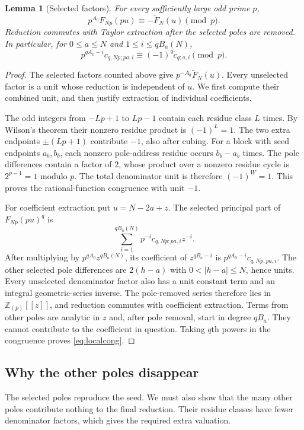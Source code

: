 \documentclass[11pt]{article}
\newtheorem{lemma}[theorem]{Lemma}
\newcommand{\Z}{\mathbb Z}\newcommand{\Q}{\mathbb Q}
\begin{document}
\begin{lemma}[Selected factors]\label{lem:selected}
For every sufficiently large odd prime $p$,
\[
 p^{A_0}F_{Np}(pu)\equiv-\widetilde F_N(u)\pmod p.
\]
Reduction commutes with Taylor extraction after the selected poles are
removed. In particular, for $0\le a\le N$ and $1\le i\le qB_a(N)$,
\begin{equation}\label{eq:localcong}
 p^{qA_0-i}c_{q,Np;pa,i}\equiv(-1)^q\widetilde c_{q;a,i}\pmod p.
\end{equation}
\end{lemma}
\begin{proof}
The selected factors counted above give $p^{-A_0}\widetilde F_N(u)$.
Every unselected factor is a unit whose reduction is independent of $u$.
We first compute their combined unit, and then justify extraction of
individual coefficients.

The odd integers from $-Lp+1$ to $Lp-1$ contain each residue class $L$
times. By Wilson's theorem their nonzero residue product is $(-1)^L=1$.
The two extra endpoints $\pm(Lp+1)$ contribute $-1$, also after cubing.
For a block with seed endpoints $a_b,b_b$, each nonzero pole-address
residue occurs $b_b-a_b$ times. The pole differences contain a factor
of $2$, whose product over a nonzero residue cycle is $2^{p-1}=1$ modulo
$p$. The total denominator unit is therefore $(-1)^W=1$. This proves
the rational-function congruence with unit $-1$.

For coefficient extraction put $u=N-2a+z$. The selected principal part
of $F_{Np}(pu)^q$ is
\[
 \sum_{i=1}^{qB_a(N)}p^{-i}c_{q,Np;pa,i}z^{-i}.
\]
After multiplying by $p^{qA_0}z^{qB_a(N)}$, its coefficient of
$z^{qB_a-i}$ is $p^{qA_0-i}c_{q,Np;pa,i}$.
The other selected pole differences are $2(h-a)$ with
$0<|h-a|\le N$, hence units. Every unselected denominator factor also
has a unit constant term and an integral geometric-series inverse.
The pole-removed series therefore lies in $\Z_{(p)}[[z]]$, and reduction
commutes with coefficient extraction. Terms from other poles are
analytic in $z$ and, after pole removal, start in degree $qB_a$.
They cannot contribute to the coefficient in question. Taking $q$th
powers in the congruence proves \eqref{eq:localcong}.
\end{proof}

\subsection{Why the other poles disappear}
The selected poles reproduce the seed. We must also show that the many
other poles contribute nothing to the final reduction. Their residue
classes have fewer denominator factors, which gives the required extra
valuation.
\end{document}
